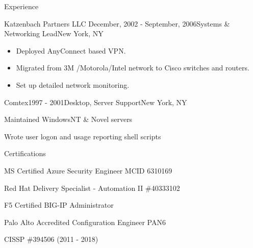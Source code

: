 \documentclass{resume} %
\begin{document}
\begin{rSection}{Experience}
\begin{rSubsection}{Katzenbach Partners LLC }{December, 2002 - September, 2006}{Systems \& Networking Lead}{New York, NY}
\begin{itemize}
	\item Deployed AnyConnect based VPN.
	\item Migrated from 3M /Motorola/Intel network to Cisco switches and routers.
        \item Set up detailed network monitoring.
  \end{itemize}
\end{rSubsection}
\begin{rSubsection}{Comtex}{1997 - 2001}{Desktop, Server Support}{New York, NY}
\item Maintained WindowsNT \& Novel servers
\item Wrote user logon and usage reporting shell scripts
\end{rSubsection}
\end{rSection}
 \begin{rSection}{Certifications}{} 
     \item MS Certified Azure Security Engineer MCID 6310169
     \item Red Hat Delivery Specialist - Automation II  \#40333102
     \item F5 Certified BIG-IP Administrator 
     \item Palo Alto Accredited Configuration Engineer  PAN6
     \item CISSP \#394506 (2011 - 2018)
 \end{rSection}
\end{document}

